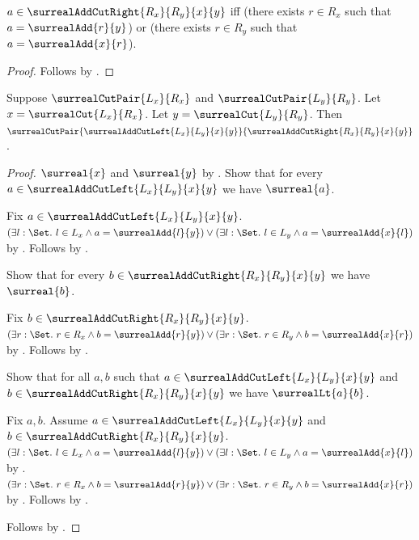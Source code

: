 \begin{proposition}\label{surreal_add_cut_right_iff}
    $a\in\surrealAddCutRight{R_x}{R_y}{x}{y}$ iff
        (there exists $r\in R_x$ such that $a=\surrealAdd{r}{y}$) or
        (there exists $r\in R_y$ such that $a=\surrealAdd{x}{r}$).
\end{proposition}
\begin{proof}
    Follows by .
\end{proof}

\begin{proposition}\label{surreal_add_general_cut_pair}
    Suppose $\surrealCutPair{L_x}{R_x}$ and
        $\surrealCutPair{L_y}{R_y}$.
    Let $x=\surrealCut{L_x}{R_x}$.
    Let $y=\surrealCut{L_y}{R_y}$.
    Then $\surrealCutPair
        {\surrealAddCutLeft{L_x}{L_y}{x}{y}}
        {\surrealAddCutRight{R_x}{R_y}{x}{y}}$.
\end{proposition}
\begin{proof}
    $\surreal{x}$ and $\surreal{y}$
        by .
    Show that for every
        $a\in\surrealAddCutLeft{L_x}{L_y}{x}{y}$ we have
        $\surreal{a}$.
    \begin{subproof}
        Fix $a\in\surrealAddCutLeft{L_x}{L_y}{x}{y}$.
        $(\exists l:\Set.\ l\in L_x\land a=\surrealAdd{l}{y})
            \lor
            (\exists l:\Set.\ l\in L_y\land a=\surrealAdd{x}{l})$
            by .
        Follows by
            .
    \end{subproof}
    Show that for every
        $b\in\surrealAddCutRight{R_x}{R_y}{x}{y}$ we have
        $\surreal{b}$.
    \begin{subproof}
        Fix $b\in\surrealAddCutRight{R_x}{R_y}{x}{y}$.
        $(\exists r:\Set.\ r\in R_x\land b=\surrealAdd{r}{y})
            \lor
            (\exists r:\Set.\ r\in R_y\land b=\surrealAdd{x}{r})$
            by .
        Follows by
            .
    \end{subproof}
    Show that for all $a,b$ such that
        $a\in\surrealAddCutLeft{L_x}{L_y}{x}{y}$ and
        $b\in\surrealAddCutRight{R_x}{R_y}{x}{y}$
        we have $\surrealLt{a}{b}$.
    \begin{subproof}
        Fix $a,b$.
        Assume $a\in\surrealAddCutLeft{L_x}{L_y}{x}{y}$ and
            $b\in\surrealAddCutRight{R_x}{R_y}{x}{y}$.
        $(\exists l:\Set.\ l\in L_x\land a=\surrealAdd{l}{y})
            \lor
            (\exists l:\Set.\ l\in L_y\land a=\surrealAdd{x}{l})$
            by .
        $(\exists r:\Set.\ r\in R_x\land b=\surrealAdd{r}{y})
            \lor
            (\exists r:\Set.\ r\in R_y\land b=\surrealAdd{x}{r})$
            by .
        Follows by
            .
    \end{subproof}
    Follows by .
\end{proof}

